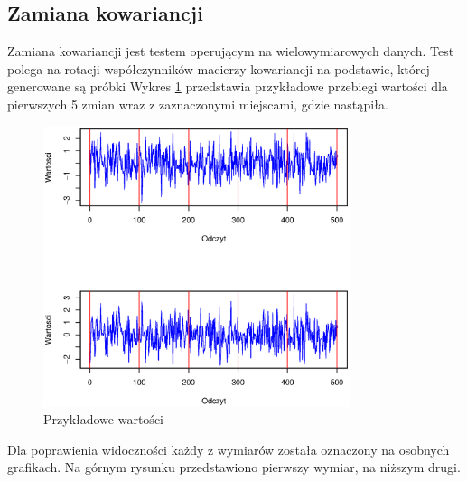 \subsection{Zamiana kowariancji}
Zamiana kowariancji jest testem operującym na wielowymiarowych danych.
Test polega na rotacji współczynników macierzy kowariancji na podstawie,
której generowane są próbki
Wykres \ref{fig:CovValues} przedstawia przykładowe przebiegi wartości dla pierwszych 5 zmian
wraz z zaznaczonymi miejscami,
gdzie nastąpiła.
\begin{figure}[htbp]
  \centering
  \includegraphics[width=0.8\textwidth]{img/ch-5-cov}
  \caption{Przykładowe wartości}
  \label{fig:CovValues}
\end{figure}
Dla poprawienia widoczności każdy z wymiarów została oznaczony na osobnych grafikach.
Na górnym rysunku przedstawiono pierwszy wymiar, na niższym drugi.

